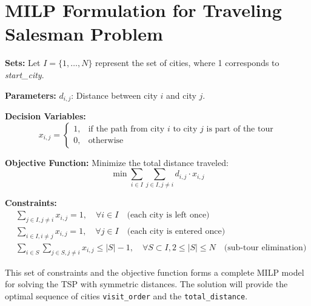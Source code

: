 \documentclass{article}
\begin{document}
\section*{MILP Formulation for Traveling Salesman Problem}

\textbf{Sets:}  
Let \( I = \{1, \ldots, N\} \) represent the set of cities, where 1 corresponds to \textit{start\_city}.

\textbf{Parameters:}  
\( d_{i,j} \): Distance between city \( i \) and city \( j \).

\textbf{Decision Variables:}  
\[
x_{i,j} =
\begin{cases} 
1, & \text{if the path from city } i \text{ to city } j \text{ is part of the tour} \\ 
0, & \text{otherwise}
\end{cases}
\]

\textbf{Objective Function:}  
Minimize the total distance traveled:
\[
\min \sum_{i \in I} \sum_{j \in I, j \neq i} d_{i,j} \cdot x_{i,j}
\]

\textbf{Constraints:}
\begin{align}
& \sum_{j \in I, j \neq i} x_{i,j} = 1, \quad \forall i \in I \quad \text{(each city is left once)} \\
& \sum_{i \in I, i \neq j} x_{i,j} = 1, \quad \forall j \in I \quad \text{(each city is entered once)} \\
& \sum_{i \in S} \sum_{j \in S, j \neq i} x_{i,j} \leq |S| - 1, \quad \forall S \subset I, 2 \leq |S| \leq N \quad \text{(sub-tour elimination)}
\end{align}

This set of constraints and the objective function forms a complete MILP model for solving the TSP with symmetric distances. The solution will provide the optimal sequence of cities \texttt{visit\_order} and the \texttt{total\_distance}.
\end{document}
